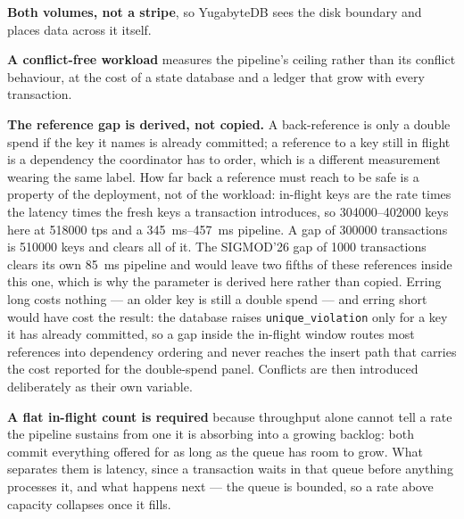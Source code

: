 \documentclass[10pt,twocolumn]{article}
\begin{document}
\textbf{Both volumes, not a stripe}, so YugabyteDB sees the disk boundary and places data across it
itself.

\textbf{A conflict-free workload} measures the pipeline's ceiling rather than its conflict behaviour,
at the cost of a state database and a ledger that grow with every transaction.

\textbf{The reference gap is derived, not copied.} A back-reference is only a double spend if the key
it names is already committed; a reference to a key still in flight is a dependency the coordinator has
to order, which is a different measurement wearing the same label. How far back a reference must reach
to be safe is a property of the deployment, not of the workload: in-flight keys are the rate times the
latency times the fresh keys a transaction introduces, so \numrange{304000}{402000} keys here at
\num{518000} tps and a \SIrange{345}{457}{\milli\second} pipeline. A gap of \num{300000} transactions
is \num{510000} keys and clears all of it. The SIGMOD'26 gap of \num{1000} transactions clears its own
\SI{85}{\milli\second} pipeline and would leave two fifths of these references inside this one, which
is why the parameter is derived here rather than copied. Erring long costs nothing --- an older key is
still a double spend --- and erring short would have cost the result: the database raises
\texttt{unique\_violation} only for a key it has already committed, so a gap inside the in-flight window
routes most references into dependency ordering and never reaches the insert path that carries the cost
reported for the double-spend panel. Conflicts are then introduced deliberately as their own variable.

\textbf{A flat in-flight count is required} because throughput alone cannot tell a rate the pipeline
sustains from one it is absorbing into a growing backlog: both commit everything offered for as long
as the queue has room to grow. What separates them is latency, since a transaction waits in that queue
before anything processes it, and what happens next --- the queue is bounded, so a rate above capacity
collapses once it fills.
\end{document}

